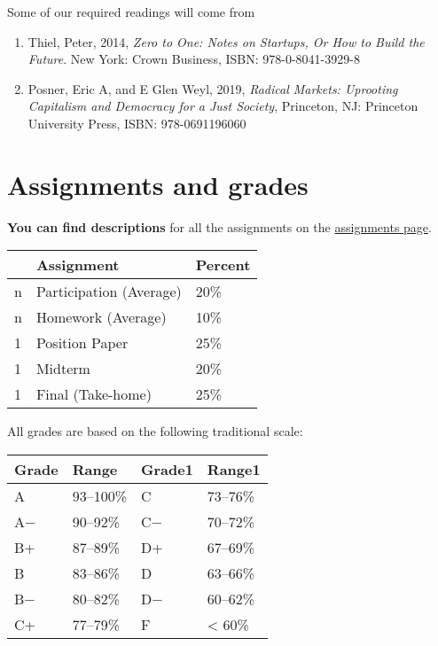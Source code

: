 \documentclass{article}
\begin{document}
Some of our required readings will come from

\begin{enumerate}
\def\labelenumi{\arabic{enumi}.}
\setcounter{enumi}{2}
\item
  Thiel, Peter, 2014, \emph{Zero to One: Notes on Startups, Or How to
  Build the Future}. New York: Crown Business, ISBN: 978-0-8041-3929-8
\item
  Posner, Eric A, and E Glen Weyl, 2019, \emph{Radical Markets:
  Uprooting Capitalism and Democracy for a Just Society}, Princeton, NJ:
  Princeton University Press, ISBN: 978-0691196060
\end{enumerate}

\hypertarget{assignments-and-grades}{%
\section{Assignments and grades}\label{assignments-and-grades}}

\textbf{You can find descriptions} for all the assignments on the
\href{http://devf19.classes.ryansafner.com/assignments/}{assignments
page}.

\begin{center}

\begin{tabular}{lll}
\toprule
 & Assignment & Percent\\
\midrule
n & Participation (Average) & 20\%\\
n & Homework (Average) & 10\%\\
1 & Position Paper & 25\%\\
1 & Midterm & 20\%\\
1 & Final (Take-home) & 25\%\\
\bottomrule
\end{tabular}
\end{center}

All grades are based on the following traditional scale:

\begin{center}

\begin{tabular}{llll}
\toprule
Grade & Range & Grade1 & Range1\\
\midrule
A & 93–100\% & C & 73–76\%\\
A− & 90–92\% & C− & 70–72\%\\
B+ & 87–89\% & D+ & 67–69\%\\
B & 83–86\% & D & 63–66\%\\
B− & 80–82\% & D− & 60–62\%\\
\addlinespace
C+ & 77–79\% & F & < 60\%\\
\bottomrule
\end{tabular}
\end{center}
\end{document}
